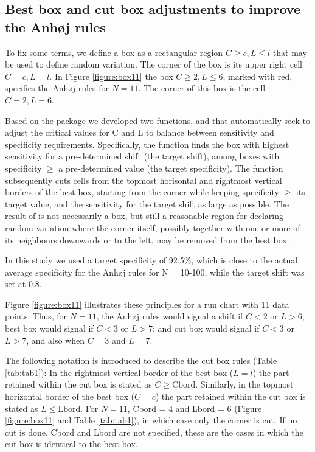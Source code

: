 \hypertarget{best-box-and-cut-box-adjustments-to-improve-the-anhj-rules}{%
\subsection{Best box and cut box adjustments to improve the Anhøj
rules}\label{best-box-and-cut-box-adjustments-to-improve-the-anhj-rules}}

To fix some terms, we define a box as a rectangular region
\(C \geq c, L \leq l\) that may be used to define random variation. The
corner of the box is its upper right cell \(C = c, L = l\). In Figure
\ref{figure:box11} the box \(C \geq 2, L \leq 6\), marked with red,
specifies the Anhøj rules for \(N=11\). The corner of this box is the
cell \(C = 2, L = 6\).

Based on the  package we developed two functions,
 and  that automatically seek to adjust
the critical values for C and L to balance between sensitivity and
specificity requirements. Specifically, the  function
finds the box with highest sensitivity for a pre-determined shift (the
target shift), among boxes with specificity \(\geq\) a pre-determined
value (the target specificity). The  function
subsequently cuts cells from the topmost horisontal and rightmost
vertical borders of the best box, starting from the corner while keeping
specificity \(\geq\) its target value, and the sensitivity for the
target shift as large as possible. The result of  is not
necessarily a box, but still a reasonable region for declaring random
variation where the corner itself, possibly together with one or more of
its neighbours downwards or to the left, may be removed from the best
box.

In this study we used a target specificity of 92.5\%, which is close to
the actual average specificity for the Anhøj rules for N = 10-100, while
the target shift was set at 0.8.

Figure \ref{figure:box11} illustrates these principles for a run chart
with 11 data points. Thus, for \(N = 11\), the Anhøj rules would signal
a shift if \(C < 2\) or \(L > 6\); best box would signal if \(C < 3\) or
\(L > 7\); and cut box would signal if \(C < 3\) or \(L > 7\), and also
when \(C = 3\) and \(L = 7\).

The following notation is introduced to describe the cut box rules
(Table \ref{tab:tab1}): In the rightmost vertical border of the best box
(\(L = l\)) the part retained within the cut box is stated as
\(C\geq \text{Cbord}\). Similarly, in the topmost horizontal border of
the best box (\(C = c\)) the part retained within the cut box is stated
as \(L \leq \text{Lbord}\). For \(N = 11\), Cbord = 4 and Lbord = 6
(Figure \ref{figure:box11} and Table \ref{tab:tab1}), in which case only
the corner is cut. If no cut is done, Cbord and Lbord are not specified,
these are the cases in which the cut box is identical to the best box.

